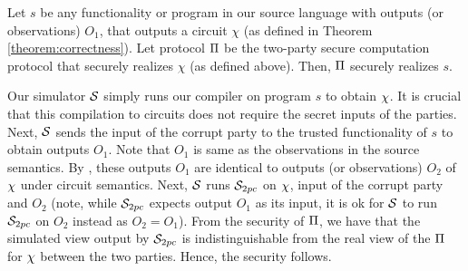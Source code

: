 \begin{theorem}[Security]\label{theorem:security}
Let $s$ be any functionality or program in our source language with
outputs (or observations) $O_1$, that outputs a circuit
$\chi$ (as defined in Theorem \ref{theorem:correctness}). Let protocol
$\Pi$ be the two-party secure computation protocol that securely
realizes $\chi$ (as defined above). Then, $\Pi$ securely realizes
$s$.
\end{theorem}

Our simulator $\mathcal{S}$ simply runs our compiler on program $s$ to obtain $\chi$. It is crucial that this compilation to circuits does not require the secret inputs of the parties. Next, $\mathcal{S}$ sends the input of the corrupt party to the trusted functionality of $s$ to obtain outputs $O_1$. Note that $O_1$ is same as the observations in the source semantics. 
By , these outputs $O_1$ are identical to outputs (or observations) $O_2$ of $\chi$ under circuit semantics. 
Next, $\mathcal{S}$ runs $\simu_{\tiny{2pc}}$ on $\chi$, input of the corrupt party and $O_2$ (note, while $\simu_{\tiny{2pc}}$ expects output $O_1$ as its input, it is ok for $\mathcal{S}$ to run $\simu_{\tiny{2pc}}$ on $O_2$ instead as $O_2=O_1$). 
From the security of $\Pi$, we have that the simulated view output by $\simu_{\tiny{2pc}}$ is indistinguishable from the real view of the $\Pi$ for $\chi$ between the two parties. Hence, the security follows.
 

